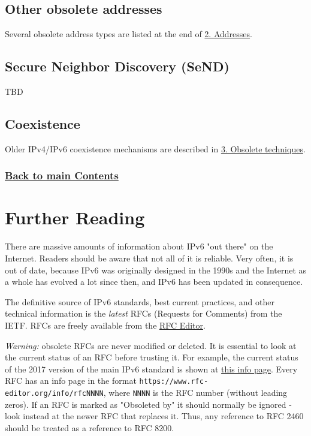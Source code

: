 \documentclass[
]{article}
\begin{document}
\subsection{Other obsolete addresses}\label{other-obsolete-addresses}

Several obsolete address types are listed at the end of
\hyperref[addresses]{2. Addresses}.

\subsection{Secure Neighbor Discovery
(SeND)}\label{secure-neighbor-discovery-send}

TBD

\subsection{Coexistence}\label{coexistence}

Older IPv4/IPv6 coexistence mechanisms are described in
\hyperref[obsolete-techniques]{3. Obsolete techniques}.

\subsubsection{\texorpdfstring{\hyperref[list-of-contents]{Back to main
Contents}}{Back to main Contents}}\label{back-to-main-contents-9}

\pagebreak

\section{Further Reading}\label{further-reading}

There are massive amounts of information about IPv6 "out there" on the
Internet. Readers should be aware that not all of it is reliable. Very
often, it is out of date, because IPv6 was originally designed in the
1990s and the Internet as a whole has evolved a lot since then, and IPv6
has been updated in consequence.

The definitive source of IPv6 standards, best current practices, and
other technical information is the \emph{latest} RFCs (Requests for
Comments) from the IETF. RFCs are freely available from the
\href{https://www.rfc-editor.org/}{RFC Editor}.

\emph{Warning:} obsolete RFCs are never modified or deleted. It is
essential to look at the current status of an RFC before trusting it.
For example, the current status of the 2017 version of the main IPv6
standard is shown at \href{https://www.rfc-editor.org/info/rfc8200}{this
info page}. Every RFC has an info page in the format
\texttt{https://www.rfc-editor.org/info/rfcNNNN}, where \texttt{NNNN} is
the RFC number (without leading zeros). If an RFC is marked as
"Obsoleted by" it should normally be ignored - look instead at the newer
RFC that replaces it. Thus, any reference to RFC 2460 should be treated
as a reference to RFC 8200.
\end{document}
